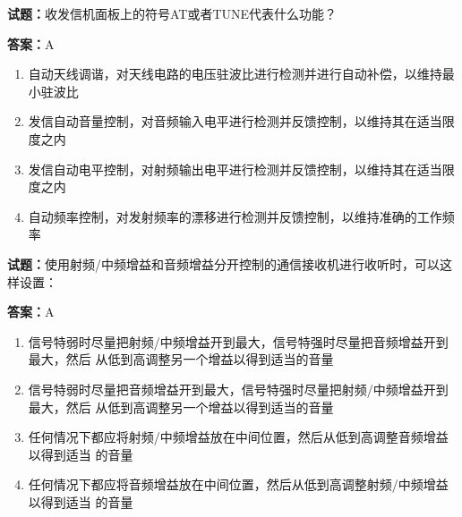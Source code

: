 \documentclass{ctexbook}
\begin{document}




\vspace{1em}

\textbf{试题：}收发信机面板上的符号AT或者TUNE代表什么功能？ 

\textbf{答案：}A 

\begin{enumerate}[leftmargin=3em]
  \item 自动天线调谐，对天线电路的电压驻波比进行检测并进行自动补偿，以维持最小驻波比 

  \item 发信自动音量控制，对音频输入电平进行检测并反馈控制，以维持其在适当限度之内 

  \item 发信自动电平控制，对射频输出电平进行检测并反馈控制，以维持其在适当限度之内 

  \item 自动频率控制，对发射频率的漂移进行检测并反馈控制，以维持准确的工作频率 

\end{enumerate}





\vspace{1em}

\textbf{试题：}使用射频/中频增益和音频增益分开控制的通信接收机进行收听时，可以这样设置： 

\textbf{答案：}A 

\begin{enumerate}[leftmargin=3em]
  \item 信号特弱时尽量把射频/中频增益开到最大，信号特强时尽量把音频增益开到最大，然后
从低到高调整另一个增益以得到适当的音量 

  \item 信号特弱时尽量把音频增益开到最大，信号特强时尽量把射频/中频增益开到最大，然后
从低到高调整另一个增益以得到适当的音量 

  \item 任何情况下都应将射频/中频增益放在中间位置，然后从低到高调整音频增益以得到适当
的音量 

  \item 任何情况下都应将音频增益放在中间位置，然后从低到高调整射频/中频增益以得到适当
的音量 

\end{enumerate}
\end{document}
